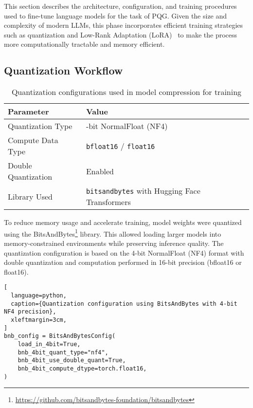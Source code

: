 This section describes the architecture, configuration, and training procedures used to
fine-tune language models for the task of PQG. Given the size and complexity of modern
LLMs, this phase incorporates efficient training strategies such as quantization and Low-Rank
Adaptation (LoRA)~\cite{hu2022lora} to make the process more computationally tractable and
memory efficient.

\subsection{Quantization Workflow}

\begin{table}[t]
  \centering
  \scriptsize
  \renewcommand{\arraystretch}{1.3}
  \begin{tabularx}{0.95\textwidth}{
    >{\raggedright\arraybackslash}p{5cm}
    >{\centering\arraybackslash}X
  }
    \toprule
    \textbf{Parameter} & \textbf{Value} \\
    \midrule
    Quantization Type & 4-bit NormalFloat (NF4) \\
    Compute Data Type & \texttt{bfloat16} / \texttt{float16} \\
    Double Quantization & Enabled \\
    Library Used & \texttt{bitsandbytes} with Hugging Face Transformers \\
    \bottomrule
  \end{tabularx}
  \caption{Quantization configurations used in model compression for training}
  \label{table:quant-config}
\end{table}

To reduce memory usage and accelerate training, model weights were quantized using
the BitsAndBytes\footnote{\url{https://github.com/bitsandbytes-foundation/bitsandbytes}} library. This allowed loading larger models into memory-constrained
environments while preserving inference quality. The quantization configuration is based
on the 4-bit NormalFloat (NF4) format with double quantization and computation performed
in 16-bit precision (bfloat16 or float16).

\begin{lstlisting}[
  language=python,
  caption={Quantization configuration using BitsAndBytes with 4-bit NF4 precision},
  xleftmargin=3cm,
]
bnb_config = BitsAndBytesConfig(
    load_in_4bit=True,
    bnb_4bit_quant_type="nf4",
    bnb_4bit_use_double_quant=True,
    bnb_4bit_compute_dtype=torch.float16,
)
\end{lstlisting}

